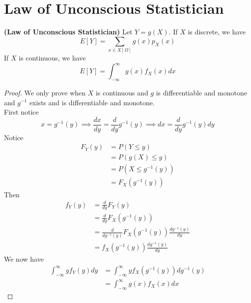 \documentclass{report}
\begin{document}
\section{Law of Unconscious Statistician}
\begin{theorem}
\label{2.2.1}
\textbf{(Law of Unconscious Statistician)} Let $Y=g(X)$. If $X$ is discrete, we have
\begin{equation}
E[Y]=\sum_{x\in X[\Omega]} g(x)p_X(x)
\end{equation}
If $X$ is continuous, we have
\begin{equation}
E[Y]=\int_{-\infty}^\infty g(x)f_X(x)dx
\end{equation}
\end{theorem}
\begin{proof}
We only prove when $X$ is continuous and $g$ is differentiable and monotone and $g^{-1}$ exists and is differentiable and monotone.\\

First notice
\begin{equation}
x=g^{-1}(y)\implies \frac{dx}{dy}=\frac{d}{dy}g^{-1}(y)\implies dx=\frac{d}{dy}g^{-1}(y)dy
\end{equation}
Notice
\begin{align}
F_Y(y)&=P(Y\leq y)\\
&=P(g(X)\leq y)\\
&=P(X\leq g^{-1}(y))\\
&=F_X(g^{-1}(y))
\end{align}
Then 
\begin{align}
f_Y(y)&= \frac{d}{dy}F_Y(y)\\
&=\frac{d}{dy}F_X(g^{-1}(y))\\
&=\frac{d}{dg^{-1}(y)}F_X(g^{-1}(y)) \frac{dg^{-1}(y)}{dy}\\
&=f_X(g^{-1}(y)) \frac{dg^{-1}(y)}{dy}
\end{align}
We now have
\begin{align}
\int_{-\infty}^\infty yf_Y(y)dy &=\int_{-\infty}^\infty yf_X(g^{-1}(y)) dg^{-1}(y)\\
&=\int_{-\infty}^\infty g(x)f_X(x)dx
\end{align}

\end{proof}
\end{document}
